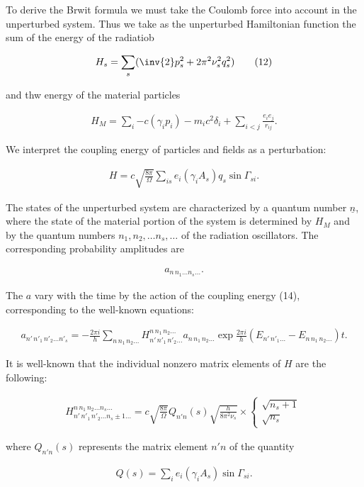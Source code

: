 \documentclass{article}
\newcommand{\nequ}[2]{
\begin{align*}
#1
\tag{#2}
\end{align*}
}
\newcommand{\sumX}[1]{\underset{#1}{\sum}}
\begin{document}
To derive the Brwit formula we must take the Coulomb force into account in the unperturbed system. Thus we take as the unperturbed Hamiltonian function the sum of the energy of the radiatiob
\nequ{
H_s = \sumX{s}{(\inv{2}p_s^2 + 2\pi^2 \nu_s^2 q_s^2)}
}{12}
and thw energy of the material particles
\nequ{
H_M = \sumX{i}{-c(\gamma_i p_i) - m_i c^2 \delta_i} + \sumX{i<j}{\frac{e_i e_j}{r_{ij}}}.
}{13}
We interpret the coupling energy of particles and fields as a perturbation:
\nequ{
H = c\sqrt{\frac{8\pi}{\Omega}}\sumX{is}{e_i (\gamma_i A_s) q_s \sin\Gamma_{si}}.
}{14}
The states of the unperturbed system are characterized by a quantum number $\underline{n}$, where the state of the material portion of the system is determined by $H_M$ and by the quantum numbers $n_1, n_2, \dots n_s, \dots$ of the radiation oscillators. The corresponding probability amplitudes are
\nequ{
a_{n\,n_1\dots n_s \dots}.
}{15}
The $a$ vary with the time by the action of the coupling energy (14), corresponding to the well-known equations:
\nequ{
a_{n'\,n'_1\,n'_2\dots n'_s} = -\frac{2\pi i}{h}\sumX{n\,n_1\,n_2\dots}{
H_{n'\,n'_1\,n'_2\dots}^{n\,n_1\,n_2\dots} a_{n\,n_1\,n_2 \dots}
\exp{\frac{2\pi i}{h}(E_{n'\,n'_1\dots} - E_{n\,n_1\,n_2\dots})t}.
}
}{16}
It is well-known that the individual nonzero matrix elements of $H$ are the following:
\nequ{
H_{n'\,n'_1\,n'_2\dots n_s \pm 1 \dots}^{n\,n_1\,n_2\dots n_s \dots} =
c\sqrt{\frac{8\pi}{\Omega}}Q_{n'n}(s)\sqrt{\frac{h}{8\pi^2\nu_s}}\times
\begin{cases}
\sqrt{n_s + 1}\\
\sqrt{n_s}
\end{cases}
}{17}
where $Q_{n'n}(s)$ represents the matrix element $n'n$ of the quantity
\nequ{
Q(s) = \sumX{i}{e_i(\gamma_i A_s)\sin\Gamma_{si}}.
}{18}
\end{document}
